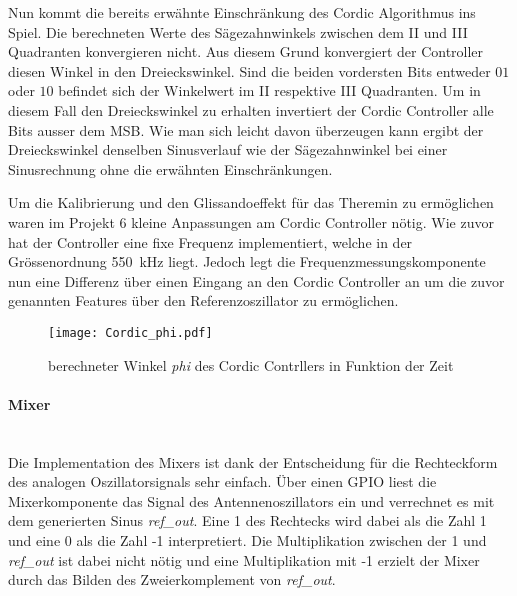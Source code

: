 Nun kommt die bereits erwähnte Einschränkung des Cordic Algorithmus ins Spiel. Die berechneten Werte des Sägezahnwinkels zwischen dem II und III Quadranten konvergieren nicht. Aus diesem Grund konvergiert der Controller diesen Winkel in den Dreieckswinkel. Sind die beiden vordersten Bits entweder \(01\) oder \(10\) befindet sich der Winkelwert im II respektive III Quadranten. Um in diesem Fall den Dreieckswinkel zu erhalten invertiert der Cordic Controller alle Bits ausser dem MSB. Wie man sich leicht davon überzeugen kann ergibt der Dreieckswinkel denselben Sinusverlauf wie der Sägezahnwinkel bei einer Sinusrechnung ohne die erwähnten Einschränkungen. \cite{Cordic}

Um die Kalibrierung und den Glissandoeffekt für das Theremin zu ermöglichen waren im Projekt 6 kleine Anpassungen am Cordic Controller nötig. Wie zuvor hat der Controller eine fixe Frequenz implementiert, welche in der Grössenordnung \SI{550}{kHz} liegt. Jedoch legt die Frequenzmessungskomponente nun eine Differenz über einen Eingang an den Cordic Controller an um die zuvor genannten Features über den Referenzoszillator zu ermöglichen.


\begin{figure}[h!]
	\centering
	\texttt{[image: Cordic\_phi.pdf]}
	\caption{berechneter Winkel \textit{phi} des Cordic Contrllers in Funktion der Zeit} 
	\label{img:Cordic_phi}
\end{figure}  


\paragraph{Mixer}\mbox{}\\

Die Implementation des Mixers ist dank der Entscheidung für die Rechteckform des analogen Oszillatorsignals sehr einfach. Über einen GPIO liest die Mixerkomponente das Signal des Antennenoszillators ein und verrechnet es mit dem generierten Sinus \textit{ref\_out}. Eine 1 des Rechtecks wird dabei als die Zahl 1 und eine 0 als die Zahl -1 interpretiert. Die Multiplikation zwischen der 1 und \textit{ref\_out} ist dabei nicht nötig und eine Multiplikation mit -1 erzielt der Mixer durch das Bilden des Zweierkomplement von \textit{ref\_out}.

